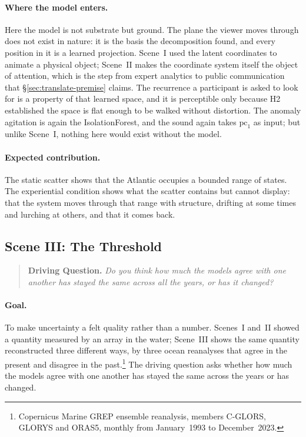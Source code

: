\paragraph{Where the model enters.} Here the model is not substrate but ground. The plane the viewer moves through does not exist in nature: it is the basis the decomposition found, and every position in it is a learned projection. Scene~I used the latent coordinates to animate a physical object; Scene~II makes the coordinate system itself the object of attention, which is the step from expert analytics to public communication that \S\ref{sec:translate-premise} claims. The recurrence a participant is asked to look for is a property of that learned space, and it is perceptible only because H2 established the space is flat enough to be walked without distortion. The anomaly agitation is again the IsolationForest, and the sound again takes $\mathrm{pc}_1$ as input; but unlike Scene~I, nothing here would exist without the model.

\paragraph{Expected contribution.} The static scatter shows that the Atlantic occupies a bounded range of states. The experiential condition shows what the scatter contains but cannot display: that the system moves through that range with structure, drifting at some times and lurching at others, and that it comes back.
 
\subsection{Scene III: The Threshold}
\label{subsec:scene-threshold}

\begin{quote}
\textbf{Driving Question.} \emph{Do you think how much the models agree with one another has stayed the same across all the years, or has it changed?}
\end{quote}
 


\paragraph{Goal.} To make uncertainty a felt quality rather than a number. Scenes~I and~II showed a quantity measured by an array in the water; Scene~III shows the same quantity reconstructed three different ways, by three ocean reanalyses that agree in the present and disagree in the past.\footnote{Copernicus Marine GREP ensemble reanalysis, members C-GLORS, GLORYS and ORAS5, monthly from January~1993 to December~2023.} The driving question asks whether how much the models agree with one another has stayed the same across the years or has changed.
 

